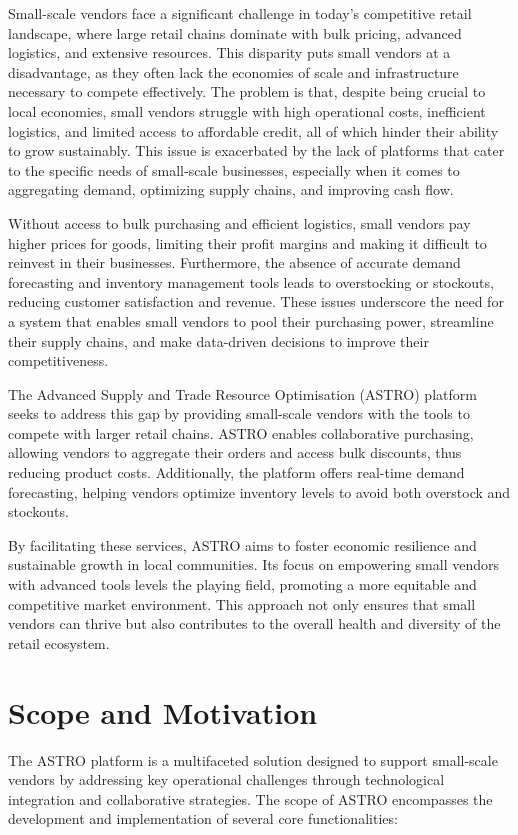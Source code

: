 Small-scale vendors face a significant challenge in today’s competitive retail landscape, where large retail chains dominate with bulk pricing, advanced logistics, and extensive resources. This disparity puts small vendors at a disadvantage, as they often lack the economies of scale and infrastructure necessary to compete effectively. The problem is that, despite being crucial to local economies, small vendors struggle with high operational costs, inefficient logistics, and limited access to affordable credit, all of which hinder their ability to grow sustainably. This issue is exacerbated by the lack of platforms that cater to the specific needs of small-scale businesses, especially when it comes to aggregating demand, optimizing supply chains, and improving cash flow.

Without access to bulk purchasing and efficient logistics, small vendors pay higher prices for goods, limiting their profit margins and making it difficult to reinvest in their businesses. Furthermore, the absence of accurate demand forecasting and inventory management tools leads to overstocking or stockouts, reducing customer satisfaction and revenue. These issues underscore the need for a system that enables small vendors to pool their purchasing power, streamline their supply chains, and make data-driven decisions to improve their competitiveness.

The Advanced Supply and Trade Resource Optimisation (ASTRO) platform seeks to address this gap by providing small-scale vendors with the tools to compete with larger retail chains. ASTRO enables collaborative purchasing, allowing vendors to aggregate their orders and access bulk discounts, thus reducing product costs. Additionally, the platform offers real-time demand forecasting, helping vendors optimize inventory levels to avoid both overstock and stockouts.

By facilitating these services, ASTRO aims to foster economic resilience and sustainable growth in local communities. Its focus on empowering small vendors with advanced tools levels the playing field, promoting a more equitable and competitive market environment. This approach not only ensures that small vendors can thrive but also contributes to the overall health and diversity of the retail ecosystem.

\section{Scope and Motivation}
The ASTRO platform is a multifaceted solution designed to support small-scale vendors by addressing key operational challenges through technological integration and collaborative strategies. The scope of ASTRO encompasses the development and implementation of several core functionalities:

